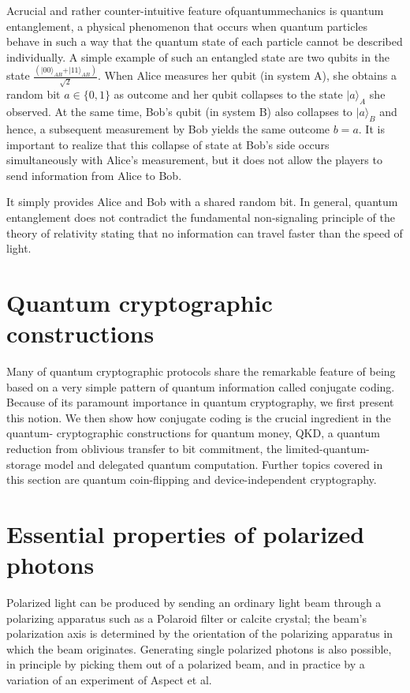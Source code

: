 Acrucial and rather counter-intuitive feature ofquantummechanics is quantum entanglement, a physical phenomenon that occurs when quantum particles behave in such a way that the quantum state of each particle cannot be described individually. A simple example of such an entangled state are two qubits in the state $\frac{(\vert 00\rangle_{AB} +\vert 11\rangle_{AB})}{\sqrt{2}}$. When Alice measures her
qubit (in system A), she obtains a random bit $a \in \{0, 1\}$ as outcome and her qubit collapses  to the state $\vert a\rangle_A$ she observed. At the same time, Bob’s qubit (in system B) also collapses to $\vert a\rangle_B$ and hence, a subsequent measurement by Bob yields the same outcome $b = a$. It is important to realize that this collapse of state at Bob’s side occurs simultaneously with Alice’s measurement, but it does not allow the players to send information from Alice to Bob.

It simply provides Alice and Bob with a shared random bit. In general, quantum entanglement does not contradict the fundamental non-signaling principle of the theory of relativity stating that no information can travel faster than the speed of light.


\section{Quantum cryptographic constructions}
Many of quantum cryptographic protocols share the remarkable feature of being based on a very simple pattern of quantum information called conjugate coding. Because of its paramount importance in quantum cryptography, we first present this notion. We then show how conjugate coding is the crucial ingredient in the quantum- cryptographic constructions for quantum money, QKD, a quantum reduction from oblivious transfer to bit commitment, the limited-quantum-storage model and delegated quantum computation. Further topics covered in this section are quantum coin-flipping and device-independent cryptography.



\section{Essential properties of polarized photons}

Polarized light can be produced by sending an ordinary
light beam through a polarizing apparatus such as a Polaroid filter or calcite crystal; the beam’s polarization axis is determined by the orientation of the polarizing apparatus in which the beam originates. Generating single polarized photons is also possible, in principle by picking them out of a polarized beam, and in practice by a variation of an experiment of Aspect \textcite{Aspect1982} et al.

